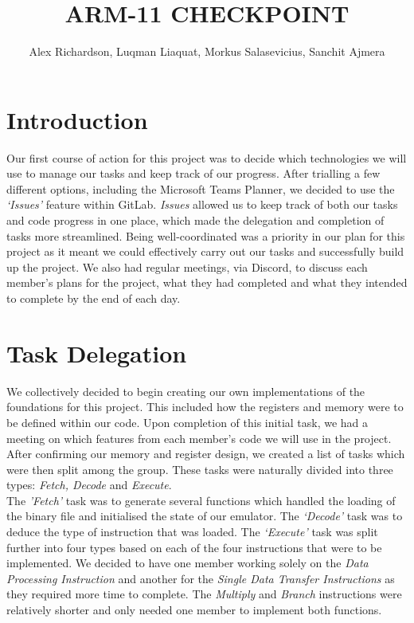 \documentclass[10pt]{article}
\begin{document}
\title{\vspace{-2cm}ARM-11 CHECKPOINT}

\date{}
 
\author{Alex Richardson, Luqman Liaquat, Morkus Salasevicius, Sanchit Ajmera}

\maketitle

\section*{Introduction}
Our first course of action for this project was to decide which technologies we will use to manage our tasks and keep track of our progress. After trialling a few different options, including the Microsoft Teams Planner, we decided to use the
\textsl{‘Issues’} feature within GitLab. \textsl{Issues} allowed us to keep track of both our tasks and code progress in one place, which made the delegation and completion of tasks more streamlined. Being well-coordinated was a priority in our plan for this project as it meant we could effectively carry out our tasks and successfully build up the project. We also had regular meetings, via Discord, to discuss each member’s plans for the project, what they had completed and what they intended to complete by the end of each day.

\section*{Task Delegation}
We collectively decided to begin creating our own implementations of the foundations for this project. This included how the registers and memory were to be defined within our code. Upon completion of this initial task, we had a meeting on which features from each member’s code we will use in the project. After confirming our memory and register design, we created a list of tasks which were then split among the group. These tasks were naturally divided into three types: \textsl{Fetch, Decode} and \textsl{Execute}.
\\

The \textsl{'Fetch'} task was to generate several functions which handled the loading of the binary file and initialised
the state of our emulator. The \textsl{‘Decode’} task was to deduce the type of instruction that was loaded. The \textsl{‘Execute’} task was split further into four types based on each of the four instructions that were to be implemented. We decided to have one member working solely on the \textsl{Data Processing Instruction} and another for the \textsl{Single Data Transfer Instructions} as they required more time to complete. The \textsl{Multiply} and \textsl{Branch} instructions were relatively shorter and only needed one member to implement both functions.
\end{document}
